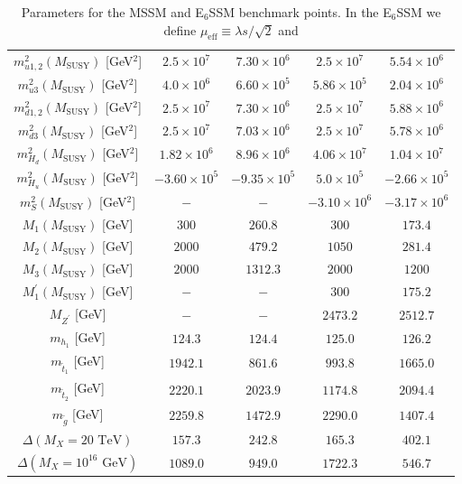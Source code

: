 \documentclass[preprint,amsmath,amssymb,aps,superscriptaddress,prd,showpacs,floatfix,nofootinbib]{revtex4-1}
\begin{document}
\begin{table}[h]
\begin{ruledtabular}
\begin{tabular}{ccccc}
$m_{u1,2}^2(M_{\mathrm{SUSY}})$ [GeV$^2$] & $2.5\times 10^7$ & $7.30\times 10^6$ & $2.5\times 10^7$ & $5.54\times 10^6$ \\
$m_{u3}^2(M_{\mathrm{SUSY}})$ [GeV$^2$] & $4.0 \times 10^6$ & $6.60\times10^5$& $5.86\times 10^5$ & $2.04\times 10^6$ \\
$m_{d1,2}^2(M_{\mathrm{SUSY}})$ [GeV$^2$] & $2.5\times 10^7$ & $7.30\times 10^6$ & $2.5\times 10^7$ & $5.88\times 10^6$ \\
$m_{d3}^2(M_{\mathrm{SUSY}})$ [GeV$^2$] & $2.5\times 10^7$ & $7.03\times 10^6$ & $2.5\times 10^7$ & $5.78\times 10^6$ \\
$m_{H_d}^2(M_{\mathrm{SUSY}})$ [GeV$^2$] & $1.82\times 10^6$ & $8.96\times 10^6$ & $4.06\times 10^7$ & $1.04\times 10^7$ \\
$m_{H_u}^2(M_{\mathrm{SUSY}})$ [GeV$^2$] & $-3.60\times 10^5$ & $-9.35\times 10^5$ & $5.0\times 10^5$ & $-2.66\times 10^5$ \\
$m_S^2(M_{\mathrm{SUSY}})$ [GeV$^2$] & $-$ & $-$ & $-3.10\times 10^6$ & $-3.17 \times 10^6$ \\
$M_1(M_{\mathrm{SUSY}})$ [GeV] & $300$ & $260.8$ & $300$ & $173.4$ \\
$M_2(M_{\mathrm{SUSY}})$ [GeV] & $2000$ & $479.2$ & $1050$ & $281.4$ \\
$M_3(M_{\mathrm{SUSY}})$ [GeV] & $2000$ & $1312.3$ & $2000$ & $1200$ \\
$M_1^\prime(M_{\mathrm{SUSY}})$ [GeV] & $-$ & $-$ & $300$ & $175.2$ \\
\hline
$M_{Z^\prime}$ [GeV] & $-$ & $-$ & $2473.2$ & $2512.7$ \\
$m_{h_1}$ [GeV] & $124.3$ & $124.4$ & $125.0$ & $126.2$ \\
$m_{\tilde{t}_1}$ [GeV] & $1942.1$ & $861.6$ & $993.8$ & $1665.0$ \\
$m_{\tilde{t}_2}$ [GeV] & $2220.1$ & $2023.9$ & $1174.8$ & $2094.4$ \\
$m_{\tilde{g}}$ [GeV] & $2259.8$ & $1472.9$ & $2290.0$ & $1407.4$ \\
\hline
$\Delta(M_X=20\textrm{ TeV})$ & $157.3$ & $242.8$ & $165.3$ & $402.1$ \\
$\Delta(M_X=10^{16}\textrm{ GeV})$ & $1089.0$ & $949.0$ & $1722.3$ & $546.7$
\end{tabular}
\end{ruledtabular}
\caption{Parameters for the MSSM and E$_6$SSM benchmark points. In the E$_6$SSM we define $\mu_{\mathrm{eff}}\equiv \lambda s/\sqrt{2}$ and
}
\end{table}
\end{document}
